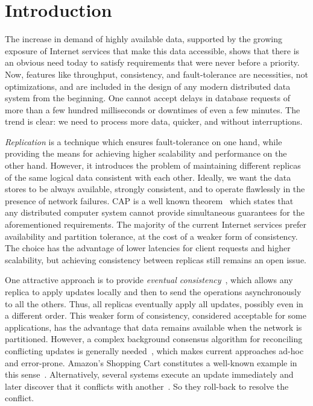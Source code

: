 \section{Introduction}
\label{sec:introduction}

The increase in demand of highly available data, supported by the growing
exposure of Internet services that make this data accessible, shows that there
is an obvious need today to satisfy requirements that were never before a priority.
Now, features like throughput, consistency, and fault-tolerance are necessities,
not optimizations, and are included in the design of any modern distributed data
system from the beginning. One cannot accept delays in database requests of more
than a few hundred milliseconds or downtimes of even a few minutes. The trend is
clear: we need to process more data, quicker, and without interruptions.

\textit{Replication} is a technique which ensures fault-tolerance on one hand,
while providing the means for achieving higher scalability and performance on the
other hand. However, it introduces the problem of maintaining different replicas
of the same logical data consistent with each other. Ideally, we want the data
stores to be always available, strongly consistent, and to operate flawlessly in
the presence of network failures. CAP is a well known
theorem~\cite{Gilbert:2002:BCF:564585.564601} which states that any distributed
computer system cannot provide simultaneous guarantees for the aforementioned
requirements. The majority of the current Internet services prefer availability
and partition tolerance, at the cost of a weaker form of consistency. The choice
has the advantage of lower latencies for client requests and higher scalability,
but achieving consistency between replicas still remains an open issue.

One attractive approach is to provide \textit{eventual
consistency}~\cite{DBLP:journals/queue/Vogels08a,Saito:2005:OR:1057977.1057980},
which allows any replica to apply updates locally and then to send the
operations asynchronously to all the others. Thus, all replicas eventually apply
all updates, possibly even in a different order. This weaker form of
consistency, considered acceptable for some applications, has the advantage that
data remains available when the network is partitioned. However, a complex
background consensus algorithm for reconciling conflicting updates is generally
needed~\cite{Terry:1995:MUC:224056.224070}, which makes current approaches
ad-hoc and error-prone. Amazon's Shopping Cart constitutes a well-known example
in this sense~\cite{DeCandia:2007:DAH:1294261.1294281}. Alternatively, several
systems execute an update immediately and later discover that it conflicts with
another~\cite{Terry:1995:MUC:224056.224070}. So they roll-back to resolve the
conflict.

